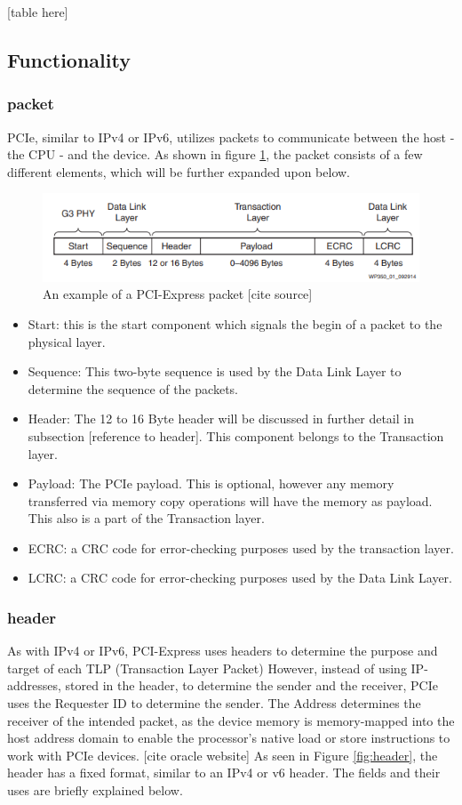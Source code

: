 [table here]


\subsection{Functionality}

\subsubsection{packet}
PCIe, similar to IPv4 or IPv6, utilizes packets to communicate between the host - the CPU - and the device. As shown in figure \ref{fig:packet}, the packet consists of a few different elements, which will be further expanded upon below. 

\begin{figure}
\includegraphics[width = \linewidth]{figures/PCIE-packet}
\caption{An example of a PCI-Express packet [cite source]}
\label{fig:packet}
\end{figure}

\begin{itemize}
\item Start: this is the start component which signals the begin of a packet to the physical layer.
\item Sequence: This two-byte sequence is used by the Data Link Layer to determine the sequence of the packets.
\item Header: The 12 to 16 Byte header will be discussed in further detail in subsection [reference to header]. This component belongs to the Transaction layer.
\item Payload: The PCIe payload. This is optional, however any memory transferred via memory copy operations will have the memory as payload. This also is a part of the Transaction layer.
\item ECRC: a CRC code for error-checking purposes used by the transaction layer.
\item LCRC: a CRC code for error-checking purposes used by the Data Link Layer.
\end{itemize}


\subsubsection{header}
As with IPv4 or IPv6, PCI-Express uses headers to determine the purpose and target of each TLP (Transaction Layer Packet)
However, instead of using IP-addresses, stored in the header, to determine the sender and the receiver, PCIe uses the Requester ID to determine the sender. The Address determines the receiver of the intended packet, as the device memory is memory-mapped into the host address domain to enable the processor's native load or store instructions to work with PCIe devices. [cite oracle website] As seen in Figure \ref{fig:header}, the header has a fixed format, similar to an IPv4 or v6 header. The fields and their uses are briefly explained below.

